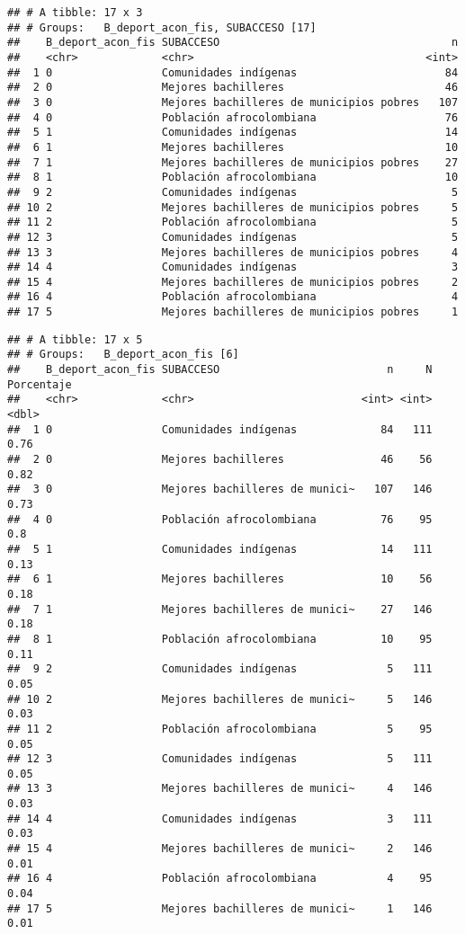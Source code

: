 \documentclass[]{article}
\theoremstyle{definition}
\theoremstyle{definition}
\theoremstyle{definition}
\theoremstyle{remark}
\begin{document}
\begin{verbatim}
## # A tibble: 17 x 3
## # Groups:   B_deport_acon_fis, SUBACCESO [17]
##    B_deport_acon_fis SUBACCESO                                    n
##    <chr>             <chr>                                    <int>
##  1 0                 Comunidades indígenas                       84
##  2 0                 Mejores bachilleres                         46
##  3 0                 Mejores bachilleres de municipios pobres   107
##  4 0                 Población afrocolombiana                    76
##  5 1                 Comunidades indígenas                       14
##  6 1                 Mejores bachilleres                         10
##  7 1                 Mejores bachilleres de municipios pobres    27
##  8 1                 Población afrocolombiana                    10
##  9 2                 Comunidades indígenas                        5
## 10 2                 Mejores bachilleres de municipios pobres     5
## 11 2                 Población afrocolombiana                     5
## 12 3                 Comunidades indígenas                        5
## 13 3                 Mejores bachilleres de municipios pobres     4
## 14 4                 Comunidades indígenas                        3
## 15 4                 Mejores bachilleres de municipios pobres     2
## 16 4                 Población afrocolombiana                     4
## 17 5                 Mejores bachilleres de municipios pobres     1
\end{verbatim}

\begin{verbatim}
## # A tibble: 17 x 5
## # Groups:   B_deport_acon_fis [6]
##    B_deport_acon_fis SUBACCESO                          n     N Porcentaje
##    <chr>             <chr>                          <int> <int>      <dbl>
##  1 0                 Comunidades indígenas             84   111       0.76
##  2 0                 Mejores bachilleres               46    56       0.82
##  3 0                 Mejores bachilleres de munici~   107   146       0.73
##  4 0                 Población afrocolombiana          76    95       0.8 
##  5 1                 Comunidades indígenas             14   111       0.13
##  6 1                 Mejores bachilleres               10    56       0.18
##  7 1                 Mejores bachilleres de munici~    27   146       0.18
##  8 1                 Población afrocolombiana          10    95       0.11
##  9 2                 Comunidades indígenas              5   111       0.05
## 10 2                 Mejores bachilleres de munici~     5   146       0.03
## 11 2                 Población afrocolombiana           5    95       0.05
## 12 3                 Comunidades indígenas              5   111       0.05
## 13 3                 Mejores bachilleres de munici~     4   146       0.03
## 14 4                 Comunidades indígenas              3   111       0.03
## 15 4                 Mejores bachilleres de munici~     2   146       0.01
## 16 4                 Población afrocolombiana           4    95       0.04
## 17 5                 Mejores bachilleres de munici~     1   146       0.01
\end{verbatim}
\end{document}
